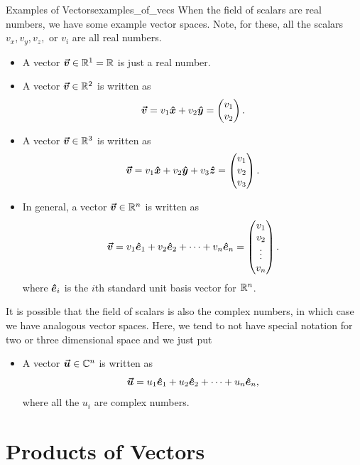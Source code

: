         \begin{ex}{Examples of Vectors}{examples_of_vecs}
        When the field of scalars are real numbers, we have some example vector spaces. Note, for these, all the scalars $v_x,v_y,v_z,$ or $v_i$ are all real numbers.
        \begin{itemize}
            \item A vector $\boldsymbol{\boldsymbol{\vec{v}}} \in \mathbb{R}^1=\mathbb{R}$ is just a real number.
            \item A vector $\boldsymbol{\boldsymbol{\vec{v}}} \in \mathbb{R}^2$ is written as 
            \[
            \boldsymbol{\boldsymbol{\vec{v}}} = v_1 \boldsymbol{\hat{x}} + v_2 \boldsymbol{\hat{y}} = \begin{pmatrix} v_1 \\ v_2 \end{pmatrix}.
            \]
            \item A vector $\boldsymbol{\boldsymbol{\vec{v}}} \in \mathbb{R}^3$ is written as 
            \[
            \boldsymbol{\boldsymbol{\vec{v}}} = v_1 \boldsymbol{\hat{x}} + v_2 \boldsymbol{\hat{y}} + v_3 \boldsymbol{\hat{z}} = \begin{pmatrix} v_1 \\ v_2 \\ v_3 \end{pmatrix}.
            \]
            \item In general, a vector $\boldsymbol{\boldsymbol{\vec{v}}} \in \mathbb{R}^n$ is written as
            \[
            \boldsymbol{\boldsymbol{\vec{v}}} = v_1 \boldsymbol{\hat{e}}_1 + v_2 \boldsymbol{\hat{e}}_2 + \cdots + v_n \boldsymbol{\hat{e}}_n = \begin{pmatrix} v_1 \\ v_2 \\ \vdots \\ v_n \end{pmatrix}.
            \]
            where $\boldsymbol{\hat{e}}_i$ is the $i$th standard unit basis vector for $\mathbb{R}^n$.
        \end{itemize}
        It is possible that the field of scalars is also the complex numbers, in which case we have analogous vector spaces. Here, we tend to not have special notation for two or three dimensional space and we just put
        \begin{itemize}
            \item A vector $\boldsymbol{\boldsymbol{\vec{u}}} \in \mathbb{C}^n$ is written as
            \[
            \boldsymbol{\boldsymbol{\vec{u}}} = u_1 \boldsymbol{\hat{e}}_1 + u_2 \boldsymbol{\hat{e}}_2 + \cdots + u_n \boldsymbol{\hat{e}}_n,
            \]
            where all the $u_i$ are complex numbers.
        \end{itemize}
        \end{ex}
        
        \section{Products of Vectors}
        
